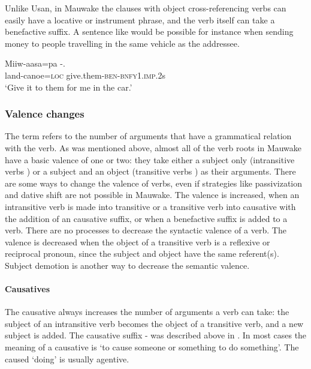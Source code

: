 Unlike Usan, in Mauwake the clauses with object cross-referencing verbs can easily have a locative or instrument phrase, and the verb itself can take a benefactive suffix. A sentence like  would be possible for instance when sending money to people travelling in the same vehicle as the addressee. 

\ea%
\label{ex:3:x338}
\gll Miiw-aasa=pa -. \\
land-canoe=\textsc{loc} give.them-\textsc{ben}-\textsc{bnfy}1.\textsc{imp}.2s \\
\glt`Give it to them for me in the car.'
\z

\subsubsection{Valence changes}\label{sec:3:z:y:x}
{}
The term  refers to the number of arguments that have a grammatical relation with the verb. As was mentioned above, almost all of the verb roots in Mauwake have a basic valence of one or two: they take either a subject only (intransitive verbs ) or a subject and an object (transitive verbs ) as their arguments. There are some ways to change the valence of verbs, even if strategies like passivization and dative shift are not possible in Mauwake. The valence is increased, when an intransitive verb is made into transitive or a transitive verb into causative with the addition of an causative suffix, or when a benefactive suffix is added to a verb. There are no processes to decrease the syntactic valence of a verb. The  valence is decreased when the object of a transitive verb is a reflexive or reciprocal pronoun, since the subject and object have the same referent(s). Subject demotion is another way to decrease the semantic valence. 

\paragraph{Causatives}\label{sec:3:a:z:y:x}
{}
The causative always increases the number of arguments a verb can take: the subject of an intransitive verb becomes the object of a transitive verb, and a new subject is added. The causative suffix - was described above in . In most cases the meaning of a causative is `to cause someone or something to do something'. The caused `doing' is usually agentive. 

